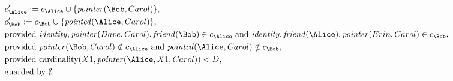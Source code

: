 \begin{align*}
&
c'_
{
\Alice
}
 := 
c_
{
\Alice
}
 \cup 
\{
\mathit{\detokenize{
pointer
}}
(
\Bob
,
Carol
)
\}
,\\
&
c'_
{
\Bob
}
 := 
c_
{
\Bob
}
 \cup 
\{
\mathit{\detokenize{
pointed
}}
(
\Alice
,
Carol
)
\}
,\\
&
\text{provided } 
\mathit{\detokenize{
identity
}}
,
\mathit{\detokenize{
pointer
}}
(
Dave
,
Carol
)
,
\mathit{\detokenize{
friend
}}
(
\Bob
)
 \in c_
{
\Alice
}
 \text{ and } 
\mathit{\detokenize{
identity
}}
,
\mathit{\detokenize{
friend
}}
(
\Alice
)
,
\mathit{\detokenize{
pointer
}}
(
Erin
,
Carol
)
 \in c_
{
\Bob
}
,\\
&
\text{provided } 
\mathit{\detokenize{
pointer
}}
(
\Bob
,
Carol
)
 \notin c_
{
\Alice
}
 \text{ and } 
\mathit{\detokenize{
pointed
}}
(
\Alice
,
Carol
)
 \notin c_
{
\Bob
}
,\\
&
\text{provided } 
\mathrm{cardinality}(
X1
,
\mathit{\detokenize{
pointer
}}
(
\Alice
,
X1
,
Carol
)
)
<
D
,\\
&
\text{guarded by } \emptyset
\end{align*}
